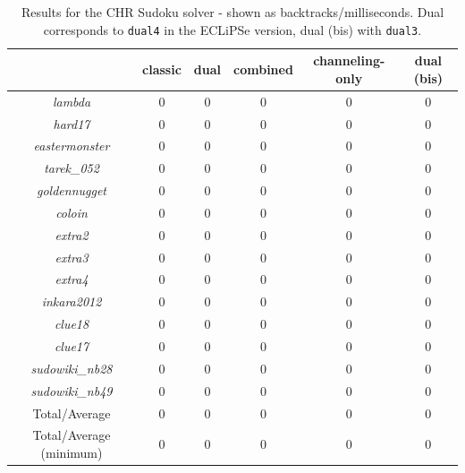 \begin{table}[H]
\footnotesize
\centering
\bgroup
\def\arraystretch{1.3}
\begin{tabular}{cccc|cc}
\multicolumn{1}{l}{} & classic & dual & combined & channeling-only & dual (bis) \\ \hline
\textit{lambda} & 0 & 0 & 0 & 0 & 0  \\
\textit{hard17} & 0 & 0 & 0 & 0 & 0  \\
\textit{eastermonster} & 0 & 0 & 0 & 0 & 0  \\
\textit{tarek\_052} & 0 & 0 & 0 & 0 & 0  \\
\textit{goldennugget} & 0 & 0 & 0 & 0 & 0  \\
\textit{coloin} & 0 & 0 & 0 & 0 & 0  \\
\textit{extra2} & 0 & 0 & 0 & 0 & 0  \\
\textit{extra3} & 0 & 0 & 0 & 0 & 0  \\
\textit{extra4} & 0 & 0 & 0 & 0 & 0  \\
\textit{inkara2012} & 0 & 0 & 0 & 0 & 0  \\
\textit{clue18} & 0 & 0 & 0 & 0 & 0  \\
\textit{clue17} & 0 & 0 & 0 & 0 & 0  \\
\textit{sudowiki\_nb28} & 0 & 0 & 0 & 0 & 0  \\
\textit{sudowiki\_nb49} & 0 & 0 & 0 & 0 & 0  \\\hline
Total/Average & 0 & 0 & 0 & 0 & 0  \\
Total/Average (minimum) & 0 & 0 & 0 & 0 & 0                      
\end{tabular}
\egroup
\caption{Results for the CHR Sudoku solver - shown as backtracks/milliseconds. Dual corresponds to \texttt{dual4} in the ECLiPSe version, dual (bis) with \texttt{dual3}.}
\label{tab:res4}
\end{table}